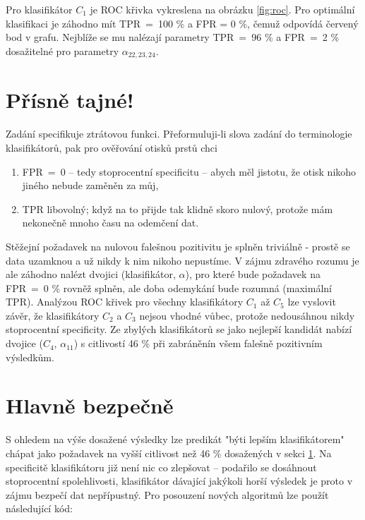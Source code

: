\documentclass[twoside]{article}
\begin{document}
Pro klasifikátor $C_1$ je ROC křivka vykreslena na obrázku \ref{fig:roc}. Pro optimální klasifikaci je záhodno mít TPR~=~100 \%
a FPR = 0 \%, čemuž odpovídá červený bod v grafu. Nejblíže se mu nalézají parametry TPR~=~96 \% a FPR~=~2 \% dosažitelné pro
parametry $\alpha_{22, 23, 24}$.


\section{Přísně tajné!}
\label{sec:secret}
Zadání specifikuje ztrátovou funkci. Přeformuluji-li slova zadání do terminologie klasifikátorů, pak pro ověřování otisků prstů chci
\begin{enumerate}
	\item FPR~=~0 -- tedy stoprocentní specificitu -- abych měl jistotu, že otisk nikoho jiného nebude zaměněn za můj,
	\item TPR libovolný; když na to přijde tak klidně skoro nulový, protože mám nekonečně mnoho času na odemčení dat.
\end{enumerate}

Stěžejní požadavek na nulovou falešnou pozitivitu je splněn triviálně - prostě se data uzamknou a už nikdy k nim nikoho nepustíme.
V zájmu zdravého rozumu je ale záhodno nalézt dvojici (klasifikátor, $\alpha$), pro které bude požadavek na FPR~=~0 \% rovněž splněn,
ale doba odemykání bude rozumná (maximální TPR). Analýzou ROC křivek pro všechny klasifikátory $C_1$ až $C_5$ lze vyslovit závěr,
že klasifikátory $C_2$ a $C_3$ nejsou vhodné vůbec, protože nedousáhnou nikdy stoprocentní specificity. Ze zbylých klasifikátorů
se jako nejlepší kandidát nabízí dvojice ($C_4$, $\alpha_{11}$) s citlivostí 46 \% při zabráněnín všem falešně pozitivním výsledkům.

\section{Hlavně bezpečně}

S ohledem na výše dosažené výsledky lze predikát "býti lepším klasifikátorem" chápat jako požadavek na vyšší citlivost než 46 \%
dosažených v sekci \ref{sec:secret}. Na specificitě klasifikátoru již není nic co zlepšovat -- podařilo se dosáhnout stoprocentní
spolehlivosti, klasifikátor dávající jakýkoli horší výsledek je proto v zájmu bezpečí dat nepřípustný.
Pro posouzení nových algoritmů lze použít následující kód:
\end{document}
